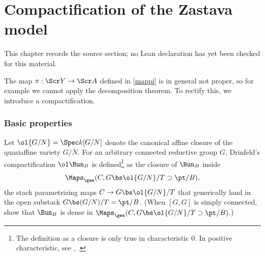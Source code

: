 \chapter{Compactification of the Zastava model}
\label{intersection-complexes-unramified-l-factors-chapter-04}

\begin{remark}
\label{intersection-complexes-unramified-l-factors-chapter-04-source}
This chapter records the source section; no Lean declaration has yet been checked for this material.
\notready
\end{remark}

\label{sect:compactification}

The map $\pi : \Scr Y \to \Scr A$ defined in \eqref{mappi}
is in general not proper, so for example
we cannot apply the decomposition theorem. To rectify this, we introduce
a compactification.

\subsection{Basic properties} \label{sect:basicproperties-comp}

Let $\ol{G/N} = \Spec k[G/N]$ denote the canonical affine closure of the
quasiaffine variety $G/N$.
For an arbitrary connected reductive group $G$, Drinfeld's compactification
$\ol\Bun_B$ is defined\footnote{The definition as a closure is only true in characteristic $0$. In positive characteristic, see \cite[\S 4.1]{ABB}, \cite[\S 7.2]{Sch}.}
 as the closure of $\Bun_B$ inside
\[ \Maps_\gen(C, G \bs \ol{G/N}/T \supset \pt/B), \]
the stack parametrizing maps $C \to G\bs \ol{G/N}/T$ that generically land in
the open substack $G \bs (G/N)/T = \pt/B$.
(When $[G,G]$ is simply connected,
\cite[Proposition 1.2.3]{BG} show that $\Bun_B$ is dense in
$\Maps_\gen(C, G\bs \ol{G/N}/T \supset \pt/B)$.)


